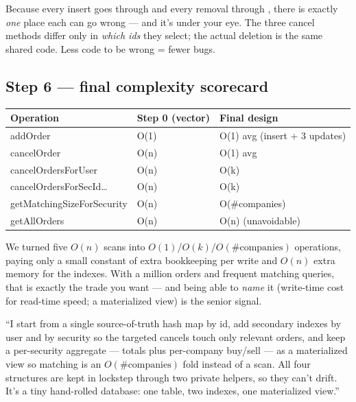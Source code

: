 \begin{keybox}
Because every insert goes through  and every removal
through , there is exactly \emph{one} place each can go
wrong --- and it's under your eye. The three cancel methods differ only in
\emph{which ids} they select; the actual deletion is the same shared code. Less
code to be wrong = fewer bugs.
\end{keybox}

\subsection{Step 6 --- final complexity scorecard}

\begin{center}
\renewcommand{\arraystretch}{1.3}
\begin{tabular}{@{}lll@{}}
\toprule
\textbf{Operation} & \textbf{Step 0 (vector)} & \textbf{Final design} \\
\midrule
addOrder & O(1) & O(1) avg (insert + 3 updates) \\
cancelOrder & \textcolor{Sell}{O(n)} & \textcolor{Buy}{O(1) avg} \\
cancelOrdersForUser & \textcolor{Sell}{O(n)} & \textcolor{Buy}{O(k)} \\
cancelOrdersForSecId\dots & \textcolor{Sell}{O(n)} & \textcolor{Buy}{O(k)} \\
getMatchingSizeForSecurity & \textcolor{Sell}{O(n)} & \textcolor{Buy}{O(\#companies)} \\
getAllOrders & O(n) & O(n) (unavoidable) \\
\bottomrule
\end{tabular}
\end{center}

\begin{intu}
We turned five $O(n)$ scans into $O(1)$/$O(k)$/$O(\#\text{companies})$ operations,
paying only a small constant of extra bookkeeping per write and $O(n)$ extra
memory for the indexes. With a million orders and frequent matching queries, that
is exactly the trade you want --- and being able to \emph{name} it (write-time cost
for read-time speed; a materialized view) is the senior signal.
\end{intu}

\begin{say}
``I start from a single source-of-truth hash map by id, add secondary indexes by
user and by security so the targeted cancels touch only relevant orders, and keep
a per-security aggregate --- totals plus per-company buy/sell --- as a materialized
view so matching is an $O(\#\text{companies})$ fold instead of a scan. All four
structures are kept in lockstep through two private helpers, so they can't drift.
It's a tiny hand-rolled database: one table, two indexes, one materialized view.''
\end{say}
